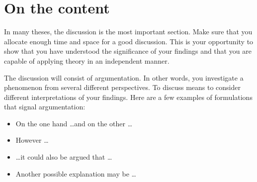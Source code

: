 \documentclass[a4paper,twoside]{bth}
\begin{document}
\section{On the content}
In many theses, the discussion is the most important section. Make sure that you allocate enough time and space for a good discussion. This is your opportunity to show that you have understood the significance of your findings and that you are capable of applying theory in an independent manner.

The discussion will consist of argumentation. In other words, you investigate a phenomenon from several different perspectives. To discuss means to consider different interpretations of your findings. Here are a few examples of formulations that signal argumentation:

\begin{itemize}
    \item On the one hand \dots and on the other \dots 
    \item However \dots
    \item \dots it could also be argued that \dots
    \item Another possible explanation may be \dots
\end{itemize}
\end{document}
